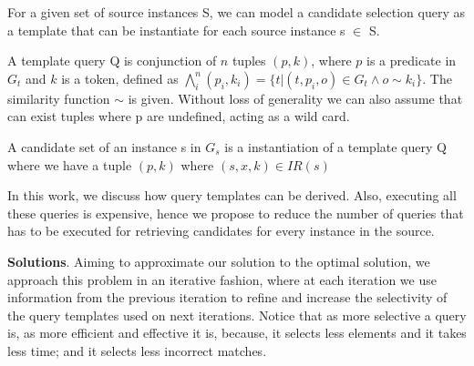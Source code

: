For a given set of source instances S, we can model a candidate selection query as a template that can be instantiate for each source instance s $\in$ S.

\begin{definition}   A template query Q is conjunction of $n$ tuples $(p, k)$, where $p$ is a predicate in $G_t$ and $k$ is a token, defined as $ \bigwedge_{i}^n (p_i, k_i)=\{t | (t,p_i,o) \in G_t  \land o \sim k_i  \}$. The similarity function $\sim$ is given. Without loss of generality we can also assume that can exist tuples where p are undefined, acting as a wild card. 
\end{definition} 
 
\begin{definition}   A candidate set of an instance s in $G_s$ is a instantiation of a template query Q where we have a tuple $(p,k)$ where $(s,x,k) \in IR(s)$
\end{definition} 

In this work, we discuss how query templates can be derived. Also, executing all these queries is expensive, hence we propose to reduce the number of queries that has to be executed for retrieving candidates for every instance in the source.

\textbf{Solutions}. Aiming to approximate our solution to the optimal solution, we approach this problem in an iterative fashion, where at each iteration we use information from the previous iteration to refine and increase the selectivity of the query templates used on next iterations. Notice that as more selective a query is, as more efficient and effective it is, because, it selects less elements and it takes less time; and it selects less incorrect matches.  

